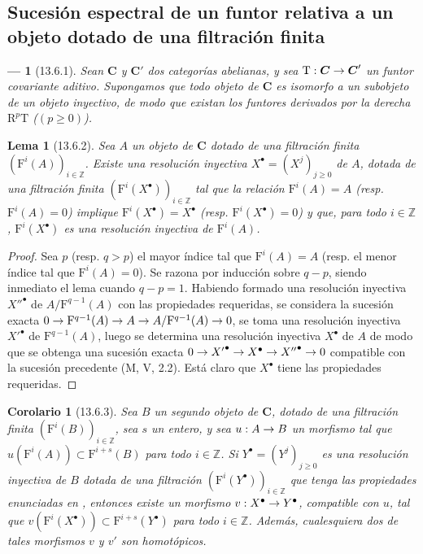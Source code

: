 \documentclass[10pt,oneside,openany]{book}
\theoremstyle{egaenv}\newtheorem*{env}{---}
\theoremstyle{egastatement}
\newtheorem*{lemma}{Lema}
\newtheorem*{corollary}{Corolario}
\theoremstyle{egadescription}
\renewcommand{\geq}{\geqslant}
\renewcommand{\to}{\mathchoice{\longrightarrow}{\rightarrow}{\rightarrow}{\rightarrow}}
\begin{document}
\subsection{Sucesión espectral de un funtor relativa a un objeto dotado de una filtración finita}
\label{subsection:0.13.6}
\label{subsection:0.13.6-fr}

\begin{env}[13.6.1]
\label{0.13.6.1}
\label{0.13.6.1-fr}
Sean $\boldsymbol{C}$ y $\boldsymbol{C}'$ dos categorías abelianas, y sea
$\mathrm T:\boldsymbol{C}\to \boldsymbol{C}'$ un funtor covariante
aditivo.
Supongamos que todo objeto de $\boldsymbol{C}$ es isomorfo a un subobjeto de
un objeto inyectivo, de modo que existan los funtores derivados por la derecha
$\mathrm R^p\mathrm T$ ($(p\geq0)$).
\end{env}

\begin{lemma}[13.6.2]
\label{0.13.6.2}
\label{0.13.6.2-fr}
Sea $A$ un objeto de $\boldsymbol{C}$ dotado de una filtración \textup{finita}
$(\mathrm F^i(A))_{i\in\mathbb Z}$.
Existe una resolución inyectiva
$X^\bullet=(X^j)_{j\geq0}$ de $A$, dotada de una filtración finita
$(\mathrm F^i(X^\bullet))_{i\in\mathbb Z}$ tal que la relación $\mathrm F^i(A)=A$ \textup{(resp. $\mathrm F^i(A)=0$)} implique $\mathrm F^i(X^\bullet)=X^\bullet$ \textup{(resp. $\mathrm F^i(X^\bullet)=0$)} y que, para todo $i\in\mathbb Z$,
$\mathrm F^i(X^\bullet)$ es una resolución inyectiva de
$\mathrm F^i(A)$.
\end{lemma}

\begin{proof}
Sea $p$ (resp. $q>p$) el mayor índice tal que
$\mathrm F^i(A)=A$ (resp. el menor índice tal que
$\mathrm F^i(A)=0$).
Se razona por inducción sobre $q-p$, siendo inmediato el lema cuando
$q-p=1$. Habiendo formado una resolución inyectiva ${X''}^\bullet$ de
$A/\mathrm F^{q-1}(A)$ con las propiedades requeridas, se considera la sucesión exacta $0\to\mathrm F^{q-1}(A)\to A\to A/\mathrm F^{q-1}(A)\to0$, se toma una resolución inyectiva ${X'}^\bullet$ de
$\mathrm F^{q-1}(A)$, luego se determina una resolución inyectiva $X^\bullet$ de $A$ de modo que se obtenga una sucesión exacta
$0\to {X'}^\bullet\to X^\bullet\to {X''}^\bullet\to0$
compatible con la sucesión precedente (M, V, 2.2).
Está claro que $X^\bullet$ tiene las propiedades requeridas.
\end{proof}

\begin{corollary}[13.6.3]
\label{0.13.6.3}
\label{0.13.6.3-fr}
Sea $B$ un segundo objeto de $\boldsymbol{C}$, dotado de una filtración
finita $(\mathrm F^i(B))_{i\in\mathbb Z}$, sea $s$ un entero,
y sea $u:A\to B$ un morfismo tal que
$u(\mathrm F^i(A))\subset\mathrm F^{i+s}(B)$
para todo $i\in\mathbb Z$.
Si $Y^\bullet=(Y^j)_{j\geq0}$ es una resolución inyectiva de $B$
dotada de una filtración
$(\mathrm F^i(Y^\bullet))_{i\in\mathbb Z}$ que tenga las propiedades
enunciadas en , entonces existe un morfismo
$v:X^\bullet\to Y^\bullet$, compatible con $u$, tal
que
$v(\mathrm F^i(X^\bullet))\subset\mathrm F^{i+s}(Y^\bullet)$
para todo $i\in\mathbb Z$.
Además, cualesquiera dos de tales morfismos $v$ y $v'$ son homotópicos.
\end{corollary}
\end{document}
